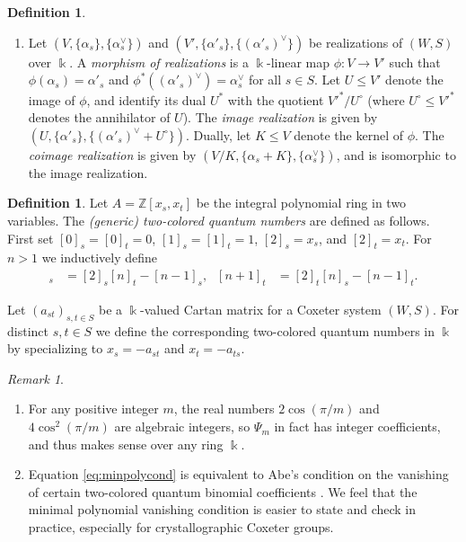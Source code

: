 \documentclass{amsart}
\theoremstyle{plain}
\theoremstyle{definition}
\newtheorem{defn}[thm]{Definition}
\theoremstyle{remark}
\newtheorem{rem}[thm]{Remark}
\numberwithin{equation}{section}
\newcommand{\defnemph}[1]{\emph{#1}}
\newcommand{\ZZ}{\mathbb{Z}}
\begin{document}
\begin{defn}
\begin{enumerate}
 \item Let $(V,\{\alpha_s\},\{\alpha_s^\vee\})$ and $(V',\{\alpha'_s\},\{(\alpha'_s)^\vee\})$ be realizations of $(W,S)$ over $\Bbbk$. 
 A \defnemph{morphism of realizations} is a $\Bbbk$-linear map $\phi:V \rightarrow V'$ such that $\phi(\alpha_s)=\alpha'_s$ and $\phi^\ast((\alpha'_s)^\vee)=\alpha_s^\vee$ for all $s \in S$. 
 Let $U \leq V'$ denote the image of $\phi$, and identify its dual $U^\ast$ with the quotient $V'^\ast/U^\circ$ (where $U^\circ \leq V'^\ast$ denotes the annihilator of $U$). 
 The \defnemph{image realization} is given by $(U,\{\alpha'_s\},\{(\alpha'_s)^\vee+U^\circ\})$. 
 Dually, let $K \leq V$ denote the kernel of $\phi$. 
 The \defnemph{coimage realization} is given by $(V/K,\{\alpha_s+K\},\{\alpha_s^\vee\})$, and is isomorphic to the image realization.
\end{enumerate}
\end{defn}

\begin{defn} \label{defn:2colqnum}
Let $A=\ZZ[x_s,x_t]$ be the integral polynomial ring in two variables. 
The \defnemph{(generic) two-colored quantum numbers} are defined as follows. 
First set $[0]_s=[0]_t=0$, $[1]_{s}=[1]_{t}=1$, $[2]_{s}=x_s$, and $[2]_{t}=x_t$. 
For $n>1$ we inductively define
\begin{align}
[n+1]_{s}& =[2]_{s} [n]_{t} - [n-1]_{s} \text{,} & [n+1]_{t} & =[2]_{t} [n]_{s} - [n-1]_{t} \text{.} \label{eq:twocolqnum}
\end{align}

Let $(a_{st})_{s,t \in S}$ be a $\Bbbk$-valued Cartan matrix for a Coxeter system $(W,S)$. 
For distinct $s,t \in S$ we define the corresponding two-colored quantum numbers in $\Bbbk$ by specializing to $x_s=-a_{st}$ and $x_t=-a_{ts}$.
\end{defn}

\begin{rem} \hfill
\begin{enumerate}
\item For any positive integer $m$, the real numbers $2\cos(\pi/m)$ and $4\cos^2(\pi/m)$ are algebraic integers, so $\Psi_m$ in fact has integer coefficients, and thus makes sense over any ring $\Bbbk$. 

\item Equation \eqref{eq:minpolycond} is equivalent to Abe's condition \cite[Assumption~1.1]{abe-homBS} on the vanishing of certain two-colored quantum binomial coefficients \cite[Theorem~3.8]{2colJW}. 
We feel that the minimal polynomial vanishing condition is easier to state and check in practice, especially for crystallographic Coxeter groups. 
%
\end{enumerate}
\end{rem}
\end{document}
